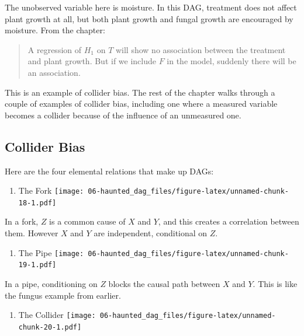 \documentclass[
]{book}
\providecommand{\tightlist}{%
  \setlength{\itemsep}{0pt}\setlength{\parskip}{0pt}}
\begin{document}
The unobserved variable here is moisture. In this DAG, treatment does not affect plant growth at all, but both plant growth and fungal growth are encouraged by moisture. From the chapter:

\begin{quote}
A regression of \(H_1\) on \(T\) will show no association between the treatment and plant growth. But if we include \(F\) in the model, suddenly there will be an association.
\end{quote}

This is an example of collider bias. The rest of the chapter walks through a couple of examples of collider bias, including one where a measured variable becomes a collider because of the influence of an unmeasured one.

\hypertarget{collider-bias}{%
\subsection*{Collider Bias}\label{collider-bias}}

Here are the four elemental relations that make up DAGs:

\begin{enumerate}
\def\labelenumi{\arabic{enumi}.}
\tightlist
\item
  The Fork
  \texttt{[image: 06-haunted\_dag\_files/figure-latex/unnamed-chunk-18-1.pdf]}
\end{enumerate}

In a fork, \(Z\) is a common cause of \(X\) and \(Y\), and this creates a correlation between them. However \(X\) and \(Y\) are independent, conditional on \(Z\).

\begin{enumerate}
\def\labelenumi{\arabic{enumi}.}
\setcounter{enumi}{1}
\tightlist
\item
  The Pipe
  \texttt{[image: 06-haunted\_dag\_files/figure-latex/unnamed-chunk-19-1.pdf]}
\end{enumerate}

In a pipe, conditioning on \(Z\) blocks the causal path between \(X\) and \(Y\). This is like the fungus example from earlier.

\begin{enumerate}
\def\labelenumi{\arabic{enumi}.}
\setcounter{enumi}{2}
\tightlist
\item
  The Collider
  \texttt{[image: 06-haunted\_dag\_files/figure-latex/unnamed-chunk-20-1.pdf]}
\end{enumerate}
\end{document}
